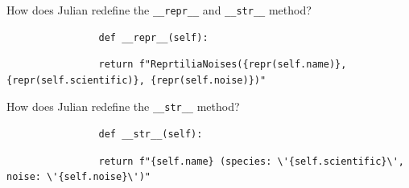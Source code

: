 \begin{blocksection}
    \begin{blocksection}
        \question How does Julian redefine the \lstinline{__repr__} and \lstinline{__str__} method?
    
        \vspace{1.5\baselineskip}
        
        \begin{lstlisting}
                def __repr__(self):
        \end{lstlisting}
        \begin{solution}[0.25in]
        \begin{lstlisting}
                return f"ReprtiliaNoises({repr(self.name)}, {repr(self.scientific)}, {repr(self.noise)})"
        \end{lstlisting}
        \end{solution}
    \end{blocksection}

    \begin{blocksection}
        \question How does Julian redefine the \lstinline{__str__} method?
    
        \vspace{1.5\baselineskip}
        
        \begin{lstlisting}
                def __str__(self):
        \end{lstlisting}
        \begin{solution}[0.25in]
        \begin{lstlisting}
                return f"{self.name} (species: \'{self.scientific}\', noise: \'{self.noise}\')"
        \end{lstlisting}
        \end{solution}
    \end{blocksection}
\end{blocksection}    
    